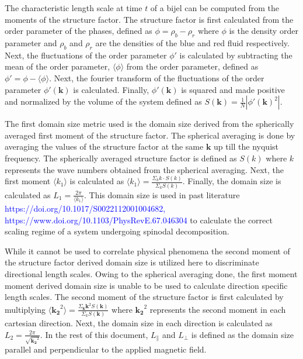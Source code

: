 The characteristic length scale at time $t$ of a bijel can be computed from the moments of the structure factor. The structure factor is first calculated from the order parameter of the phases, defined as $\phi = \rho_b - \rho_r$ where $\phi$ is the density order parameter and $\rho_b$ and $\rho_r$ are the densities of the blue and red fluid respectively. Next, the fluctuations of the order parameter $\phi'$ is calculated by subtracting the mean of the order parameter, $\langle \phi \rangle$ from the order parameter, defined as $\phi' = \phi - \langle \phi \rangle$. Next, the fourier transform of the fluctuations of the order parameter $\phi'(\mathbf{k})$ is calculated. Finally, $\phi'(\mathbf{k})$ is squared and made positive and normalized by the volume of the system defined as $S(\mathbf{k}) = \frac{1}{N} |\phi'(\mathbf{k})^2|$.

The first domain size metric used is the domain size derived from the spherically averaged first moment of the structure factor. The spherical averaging is done by averaging the values of the structure factor at the same $\mathbf{k}$ up till the nyquist frequency. The spherically averaged structure factor is defined as $S(k)$ where $k$ represents the wave numbers obtained from the spherical averaging. Next, the first moment $\langle k_1 \rangle$ is calculated as $\langle k_1 \rangle = \frac{\Sigma_{k} k\cdot S(k)}{\Sigma_{k} S(k)}$. Finally, the domain size is calculated as $L_1 = \frac{2 \pi}{\langle k_1 \rangle}$. This domain size is used in past literature \textcolor{blue}{https://doi.org/10.1017/S0022112001004682, https://www.doi.org/10.1103/PhysRevE.67.046304} to calculate the correct scaling regime of a system undergoing spinodal decomposition. 

While it cannot be used to correlate physical phenomena the second moment of the structure factor derived domain size is utilized here to discriminate directional length scales. Owing to the spherical averaging done, the first moment moment derived domain size is unable to be used to calculate direction specific length scales. The second moment of the structure factor is first calculated by multiplying $\langle \mathbf{k_2}^2 \rangle = \frac{\Sigma_{\mathbf{k}} \mathbf{k}^2 S(\mathbf{k})}{\Sigma_k S(\mathbf{k})}$ where $\mathbf{k_2}^2$ represents the second moment in each cartesian direction. Next, the domain size in each direction is calculated as $L_2 = \frac{2 \pi}{\sqrt{\mathbf{k_2}^2}}$. \cite{jansen_bijels_2011, gunther_timescales_2014} In the rest of this document, $L_{\parallel}$ and $L_{\perp}$ is defined as the domain size parallel and perpendicular to the applied magnetic field.

